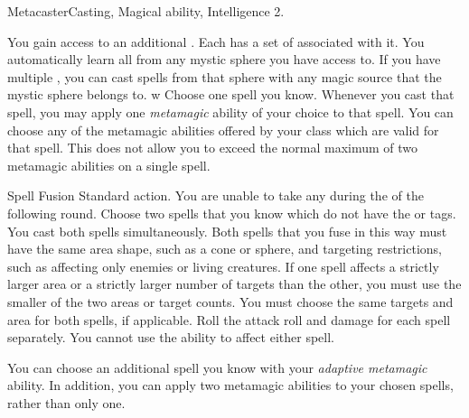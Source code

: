     \begin{magicalfeat}{Metacaster}{Casting, Magical}
        \featpre {} ability, Intelligence 2.

         You gain access to an additional .
        Each  has a set of  associated with it.
        You automatically learn all  from any mystic sphere you have access to.
        If you have multiple , you can cast spells from that sphere with any magic source that the mystic sphere belongs to.
w
         Choose one spell you know.
        Whenever you cast that spell, you may apply one \textit{metamagic} ability of your choice to that spell.
        You can choose any of the metamagic abilities offered by your class which are valid for that spell.
        This does not allow you to exceed the normal maximum of two metamagic abilities on a single spell.

        \begin{magicalactiveability}{Spell Fusion}
            \abilityusagetime Standard action.
            \abilitycost You are unable to take any  during the  of the following round.
            \rankline
            Choose two spells that you know which do not have the  or  tags.
            You cast both spells simultaneously.
            Both spells that you fuse in this way must have the same area shape, such as a cone or sphere, and targeting restrictions, such as affecting only enemies or living creatures.
            If one spell affects a strictly larger area or a strictly larger number of targets than the other, you must use the smaller of the two areas or target counts.
            You must choose the same targets and area for both spells, if applicable.
            Roll the attack roll and damage for each spell separately.
            You cannot use the  ability to affect either spell.
        \end{magicalactiveability}

         You can choose an additional spell you know with your \textit{adaptive metamagic} ability.
        In addition, you can apply two metamagic abilities to your chosen spells, rather than only one.
    \end{magicalfeat}


